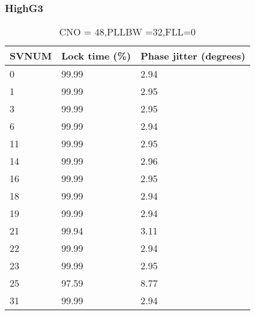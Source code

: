 \clearpage

\subsubsection{HighG3}

\begin{table}[!htb]
\centering
\begin{tabular}{|l|l|l|}
\hline
\rowcolor[HTML]{C0C0C0} 
SVNUM & Lock time (\%) & Phase jitter (degrees) \\ \hline
0     & 99.99 & 2.94          \\ \hline
\rowcolor[HTML]{EFEFEF} 
1     & 99.99   & 2.95          \\ \hline
3     & 99.99  & 2.95          \\ \hline
\rowcolor[HTML]{EFEFEF} 
6     & 99.99  & 2.94          \\ \hline
11    & 99.99  & 2.95          \\ \hline
\rowcolor[HTML]{EFEFEF} 
14    & 99.99  & 2.96          \\ \hline
16    & 99.99  & 2.95          \\ \hline
\rowcolor[HTML]{EFEFEF} 
18    & 99.99  & 2.94          \\ \hline
19    & 99.99  & 2.94         \\ \hline
\rowcolor[HTML]{EFEFEF} 
21    & 99.94  & 3.11         \\ \hline
22    & 99.99 & 2.94          \\ \hline
\rowcolor[HTML]{EFEFEF} 
23    & 99.99  & 2.95         \\ \hline
25    & 97.59  & 8.77          \\ \hline
\rowcolor[HTML]{EFEFEF} 
31    & 99.99  & 2.94         \\ \hline
\end{tabular}

\caption{CNO = 48,PLLBW =32,FLL=0}
\label{my-label}
\end{table}


